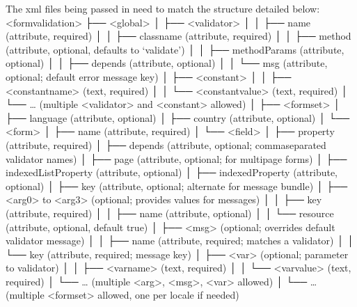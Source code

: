 \documentclass[letterpaper,10pt,english]{sphinxmanual}
\begin{document}
\begin{fulllineitems}
\sphinxAtStartPar
The xml files being passed in need to match the structure detailed below:
\textless{}form\sphinxhyphen{}validation\textgreater{}
├── \textless{}global\textgreater{}
│   ├── \textless{}validator\textgreater{}
│   │   ├── name (attribute, required)
│   │   ├── classname (attribute, required)
│   │   ├── method (attribute, optional, defaults to ‘validate’)
│   │   ├── methodParams (attribute, optional)
│   │   ├── depends (attribute, optional)
│   │   └── msg (attribute, optional; default error message key)
│   ├── \textless{}constant\textgreater{}
│   │   ├── \textless{}constant\sphinxhyphen{}name\textgreater{} (text, required)
│   │   └── \textless{}constant\sphinxhyphen{}value\textgreater{} (text, required)
│   └── … (multiple \textless{}validator\textgreater{} and \textless{}constant\textgreater{} allowed)
│
├── \textless{}formset\textgreater{}
│   ├── language (attribute, optional)
│   ├── country (attribute, optional)
│   └── \textless{}form\textgreater{}
│       ├── name (attribute, required)
│       └── \textless{}field\textgreater{}
│           ├── property (attribute, required)
│           ├── depends (attribute, optional; comma\sphinxhyphen{}separated validator names)
│           ├── page (attribute, optional; for multi\sphinxhyphen{}page forms)
│           ├── indexedListProperty (attribute, optional)
│           ├── indexedProperty (attribute, optional)
│           ├── key (attribute, optional; alternate for message bundle)
│           ├── \textless{}arg0\textgreater{} to \textless{}arg3\textgreater{} (optional; provides values for messages)
│           │   ├── key (attribute, required)
│           │   ├── name (attribute, optional)
│           │   └── resource (attribute, optional, default true)
│           ├── \textless{}msg\textgreater{} (optional; overrides default validator message)
│           │   ├── name (attribute, required; matches a validator)
│           │   └── key (attribute, required; message key)
│           ├── \textless{}var\textgreater{} (optional; parameter to validator)
│           │   ├── \textless{}var\sphinxhyphen{}name\textgreater{} (text, required)
│           │   └── \textless{}var\sphinxhyphen{}value\textgreater{} (text, required)
│           └── … (multiple \textless{}arg\textgreater{}, \textless{}msg\textgreater{}, \textless{}var\textgreater{} allowed)
│
└── … (multiple \textless{}formset\textgreater{} allowed, one per locale if needed)


\end{fulllineitems}
\end{document}

